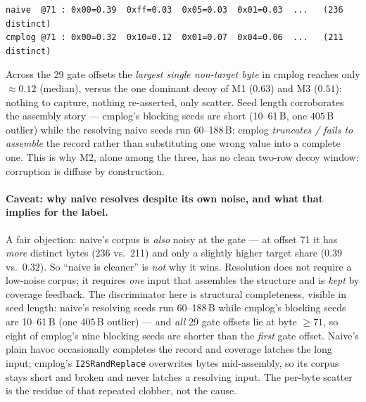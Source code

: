 \documentclass[11pt]{article}
\begin{document}
\begin{lstlisting}[style=bytes,caption={Byte distribution at gate offset 71
  (assembled target \texttt{0x00}) over the 8000-input corpora. naive peaks on
  the target; cmplog is spread over 211 distinct values with no dominant
  substitute --- the fingerprint of blind corruption, not a decoy.},
  label={lst:hb5831bytes}]
naive  @71 : 0x00=0.39  0xff=0.03  0x05=0.03  0x01=0.03  ...   (236 distinct)
cmplog @71 : 0x00=0.32  0x10=0.12  0x01=0.07  0x04=0.06  ...   (211 distinct)
\end{lstlisting}

\noindent Across the 29 gate offsets the \emph{largest single non-target byte}
in cmplog reaches only $\approx 0.12$ (median), versus the one dominant decoy of
M1 ($0.63$) and M3 ($0.51$): nothing to capture, nothing re-asserted, only
scatter. Seed length corroborates the assembly story --- cmplog's blocking seeds
are short (10--61\,B, one $405$\,B outlier) while the resolving naive seeds run
60--188\,B: cmplog \emph{truncates / fails to assemble} the record rather than
substituting one wrong value into a complete one. This is why M2, alone among
the three, has no clean two-row decoy window: corruption is diffuse by
construction.

\paragraph{Caveat: why naive resolves despite its own noise, and what that
implies for the label.} A fair objection: naive's corpus is \emph{also} noisy at
the gate --- at offset 71 it has \emph{more} distinct bytes (236 vs.\ 211) and
only a slightly higher target share ($0.39$ vs.\ $0.32$). So ``naive is
cleaner'' is \emph{not} why it wins. Resolution does not require a low-noise
corpus; it requires \emph{one} input that assembles the structure and is
\emph{kept} by coverage feedback. The discriminator here is structural
completeness, visible in seed length: naive's resolving seeds run 60--188\,B
while cmplog's blocking seeds are 10--61\,B (one $405$\,B outlier) --- and
\emph{all} 29 gate offsets lie at byte $\ge 71$, so eight of cmplog's nine
blocking seeds are shorter than the \emph{first} gate offset. Naive's plain
havoc occasionally completes the record and coverage latches the long input;
cmplog's \texttt{I2SRandReplace} overwrites bytes mid-assembly, so its corpus
stays short and broken and never latches a resolving input. The per-byte scatter
is the residue of that repeated clobber, not the cause.
\end{document}
